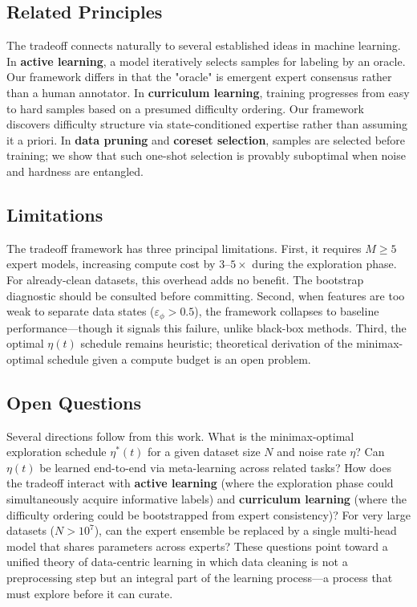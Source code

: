 \documentclass[12pt,a4paper]{article}
\begin{document}
\subsection*{Related Principles}

The tradeoff connects naturally to several established ideas in machine learning. In \textbf{active learning}, a model iteratively selects samples for labeling by an oracle. Our framework differs in that the "oracle" is emergent expert consensus rather than a human annotator. In \textbf{curriculum learning}, training progresses from easy to hard samples based on a presumed difficulty ordering. Our framework discovers difficulty structure via state-conditioned expertise rather than assuming it a priori. In \textbf{data pruning} and \textbf{coreset selection}, samples are selected before training; we show that such one-shot selection is provably suboptimal when noise and hardness are entangled.

\subsection*{Limitations}

The tradeoff framework has three principal limitations. First, it requires $M \geq 5$ expert models, increasing compute cost by $3$--$5\times$ during the exploration phase. For already-clean datasets, this overhead adds no benefit. The bootstrap diagnostic should be consulted before committing. Second, when features are too weak to separate data states ($\varepsilon_\phi > 0.5$), the framework collapses to baseline performance---though it signals this failure, unlike black-box methods. Third, the optimal $\eta(t)$ schedule remains heuristic; theoretical derivation of the minimax-optimal schedule given a compute budget is an open problem.

\subsection*{Open Questions}

Several directions follow from this work. What is the minimax-optimal exploration schedule $\eta^*(t)$ for a given dataset size $N$ and noise rate $\eta$? Can $\eta(t)$ be learned end-to-end via meta-learning across related tasks? How does the tradeoff interact with \textbf{active learning} (where the exploration phase could simultaneously acquire informative labels) and \textbf{curriculum learning} (where the difficulty ordering could be bootstrapped from expert consistency)? For very large datasets ($N > 10^7$), can the expert ensemble be replaced by a single multi-head model that shares parameters across experts? These questions point toward a unified theory of data-centric learning in which data cleaning is not a preprocessing step but an integral part of the learning process---a process that must explore before it can curate.
\end{document}
